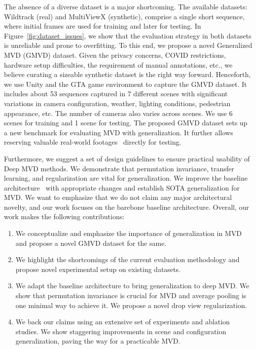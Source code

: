\documentclass[letterpaper, 10 pt, conference]{ieeeconf}  \usepackage{times}
\begin{document}
The absence of a diverse dataset is a major shortcoming. The available datasets: Wildtrack (real) and MultiViewX (synthetic), comprise a single short sequence, where initial frames are used for training and later for testing. In Figure~\ref{fig:dataset_issues}, we show that the evaluation strategy in both datasets is unreliable and prone to overfitting. To this end, we propose a novel Generalized MVD (GMVD) dataset. Given the privacy concerns, COVID restrictions, hardware setup difficulties, the requirement of manual annotations, etc., we believe curating a sizeable synthetic dataset is the right way forward. Henceforth, we use Unity and the GTA game environment to capture the GMVD dataset. It includes about 53 sequences captured in 7 different scenes with significant variations in camera configuration, weather, lighting conditions, pedestrian appearance, etc. The number of cameras also varies across scenes. We use 6 scenes for training and 1 scene for testing. The proposed GMVD dataset sets up a new benchmark for evaluating MVD with generalization. It further allows reserving valuable real-world footages~\cite{Chavdarova2018WILDTRACKAM} directly for testing. 

Furthermore, we suggest a set of design guidelines to ensure practical usability of Deep MVD methods. We demonstrate that permutation invariance, transfer learning, and regularization are vital for generalization. We improve the baseline architecture~\cite{hou2020multiview} with appropriate changes and establish SOTA generalization for MVD. We want to emphasize that we do not claim any major architectural novelty, and our work focuses on the barebone baseline architecture. Overall, our work makes the following contributions:



\begin{enumerate}
    \item We conceptualize and emphasize the importance of generalization in MVD and propose a novel GMVD dataset for the same.
    \item We highlight the shortcomings of the current evaluation methodology and propose novel experimental setup on existing datasets. 
    \item We adapt the baseline architecture to bring generalization to deep MVD. We show that permutation invariance is crucial for MVD and average pooling is one minimal way to achieve it. We propose a novel drop view regularization.
    \item  We back our claims using an extensive set of experiments and ablation studies. We show staggering improvements in scene and configuration generalization, paving the way for a practicable MVD.
\end{enumerate}
\end{document}

